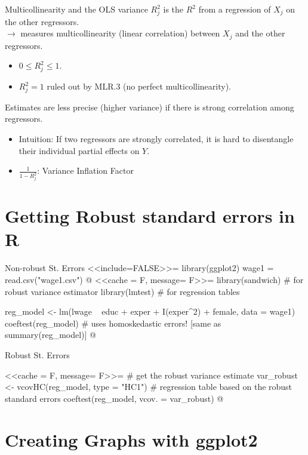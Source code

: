\documentclass[11pt, aspectratio = 169]{beamer}
\begin{document}
\begin{frame}{Multicollinearity and the OLS variance}
$R_j^2$ is the $R^2$ from a regression of $X_j$ on the other regressors. \\
$\rightarrow$ measures multicollinearity (linear correlation) between $X_j$ and the other regressors. 
\begin{itemize}
    \item $0 \leq R_j^2 \leq 1$.
    \item $ R_j^2 =1$ ruled out by MLR.3 (no perfect multicollinearity). 
\end{itemize}

Estimates are less precise (higher variance) if there is strong correlation among regressors.
\begin{itemize}
    \item Intuition: If two regressors are strongly correlated, it is hard to disentangle their individual partial effects on $Y$.
\item $\frac{1}{1-R_j^2}$: Variance Inflation Factor
\end{itemize}
\end{frame}

\section{Getting Robust standard errors in R}

\begin{frame}[fragile]{Non-robust St. Errors}
\small
<<include=FALSE>>=
library(ggplot2)
 wage1 = read.csv("wage1.csv")
@
\footnotesize
<<cache = F, message= F>>=
library(sandwich) # for robust variance estimator
library(lmtest)   # for regression tables

reg_model <- lm(lwage ~ educ + exper + I(exper^2) + female, data = wage1)
coeftest(reg_model) # uses homoskedastic errors! [same as summary(reg_model)]
@
\end{frame}

\begin{frame}[fragile]{Robust St. Errors}

\footnotesize
<<cache = F, message= F>>=
# get the robust variance estimate
var_robust <- vcovHC(reg_model, type = "HC1") 
# regression table based on the robust standard errors
coeftest(reg_model, vcov. = var_robust) 
@
\end{frame}


\section{Creating Graphs with ggplot2}
\end{document}
